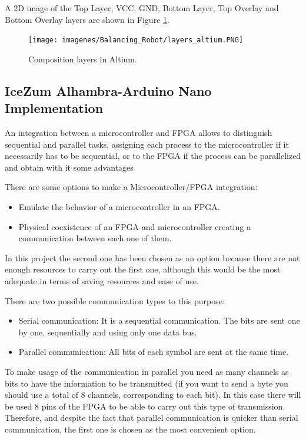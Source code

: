 A 2D image of the Top Layer, VCC, GND, Bottom Layer, Top Overlay and Bottom Overlay layers are shown in Figure \ref{fig:layers_altium}.


\begin{center}
	\begin{figure}[H]
		\center
		\texttt{[image: imagenes/Balancing\_Robot/layers\_altium.PNG]}
		\caption{Composition layers in Altium.}
		\label{fig:layers_altium}
	\end{figure}
\end{center}


\subsection{IceZum Alhambra-Arduino Nano Implementation}\label{sec:Integracion}

An integration between a microcontroller and FPGA allows to distinguish sequential and parallel tasks, assigning each process to the microcontroller if it necessarily has to be sequential, or to the FPGA if the process can be parallelized and obtain with it some advantages\newline

There are some options to make a Microcontroller/FPGA integration:

\begin{itemize}
	\item Emulate the behavior of a microcontroller in an FPGA.
	\item Physical coexistence of an FPGA and microcontroller creating a communication between each one of them.
\end{itemize}
In this project the second one has been chosen as an option because there are not enough resources to carry out the first one, although this would be the most adequate in terms of saving resources and ease of use. \newline

There are two possible communication types to this purpose:
\begin{itemize}
	\item Serial communication: It is a sequential communication. The bits are sent one by one, sequentially and using only one data bus.
	\item Parallel communication: All bits of each symbol are sent at the same time.
\end{itemize} 

To make usage of the communication in parallel you need as many channels as bits to have the information to be transmitted (if you want to send a byte you should use a total of 8 channels, corresponding to each bit). In this case there will be used 8 pins of the FPGA to be able to carry out this type of transmission. Therefore, and despite the fact that parallel communication is quicker than serial communication, the first one is chosen as the most convenient option. \newline

